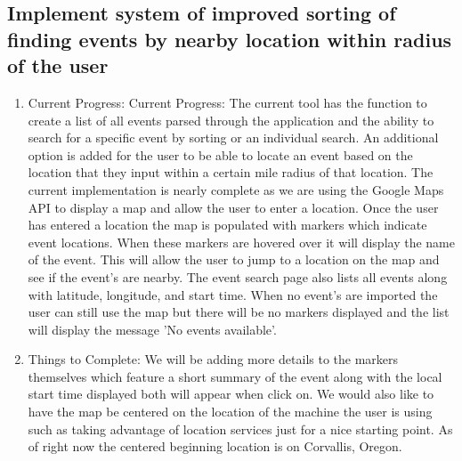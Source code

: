 \documentclass[letterpaper,10pt,onecolumn]{IEEEtran} %
\begin{document}
\subsection{Implement system of improved sorting of finding events by nearby location within radius of the user}
\begin{enumerate}[label*=\arabic*.]
  \item Current Progress: Current Progress: The current tool has the function to
    create a list of all events parsed through the application and the ability to
    search for a specific event by sorting or an individual search. An additional
    option is added for the user to be able to locate an event based on the
    location that they input within a certain mile radius of that location. The
    current implementation is nearly complete as we are using the Google Maps API
    to display a map and allow the user to enter a location. Once the user has
    entered a location the map is populated with markers which indicate event
    locations. When these markers are hovered over it will display the name of the
    event. This will allow the user to jump to a location on the map and see if
    the event's are nearby. The event search page also lists all events along with
    latitude, longitude, and start time. When no event's are imported the user can
    still use the map but there will be no markers displayed and the list will
    display the message 'No events available'.


  \item Things to Complete: We will be adding more details to the markers
    themselves which feature a short summary of the event along with the local
    start time displayed both will appear when click on. We would also like to
    have the map be centered on the location of the machine the user is using
    such as taking advantage of location services just for a nice starting
    point. As of right now the centered beginning location is on Corvallis,
    Oregon.


\end{enumerate}
\end{document}

